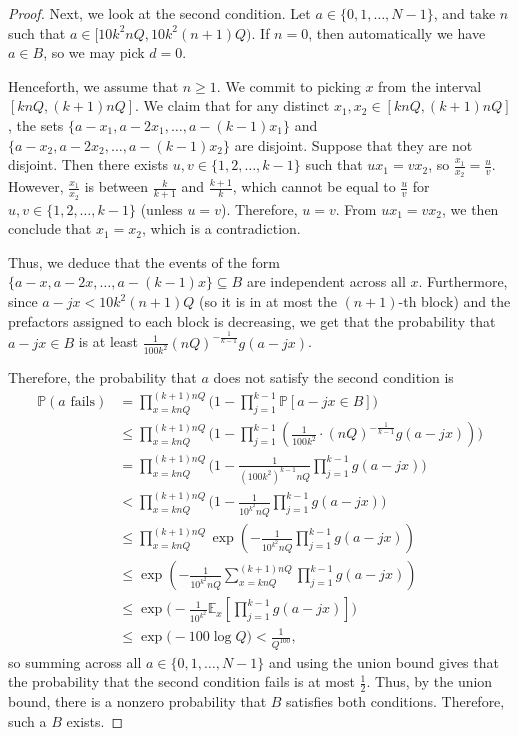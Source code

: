 \documentclass[11pt,reqno]{amsart}
\begin{document}
\begin{proof}
Next, we look at the second condition.
Let $a\in\{0,1,\dots,N-1\}$, and take $n$ such that
$a\in [10k^2nQ, 10k^2(n+1)Q)$.
If $n=0$, then automatically we have $a\in B$,
so we may pick $d=0$.

Henceforth, we assume that $n\geq 1$.
We commit to picking $x$ from the interval $[knQ, (k+1)nQ]$. 
We claim that for any distinct $x_1, x_2\in [knQ, (k+1)nQ]$,
the sets $\{a-x_1, a-2x_1,\dots,a-(k-1)x_1\}$
and $\{a-x_2,a-2x_2,\dots,a-(k-1)x_2\}$ are disjoint.
Suppose that they are not disjoint. Then there exists 
$u,v\in\{1,2,\dots,k-1\}$ such that 
$ux_1 = vx_2$, so $\tfrac{x_1}{x_2} = \tfrac uv$.
However, $\tfrac{x_1}{x_2}$ is between $\tfrac k{k+1}$
and $\tfrac{k+1}k$, which cannot be equal to 
$\tfrac uv$ for $u,v\in\{1,2,\dots,k-1\}$
(unless $u=v$).
Therefore, $u=v$. From $ux_1=vx_2$, we then conclude that 
$x_1=x_2$, which is a contradiction.

Thus, we deduce that the events of the form 
$\{a-x, a-2x,\dots,a-(k-1)x\} \subseteq B$ 
are independent across all $x$.
Furthermore, since $a-jx < 10k^2(n+1)Q$
(so it is in at most the $(n+1)$-th block)
and the prefactors assigned to each block is decreasing,
we get that the probability that $a-jx\in B$ is at least 
$\frac 1{100k^2}(nQ)^{-\frac{1}{k-1}}g(a-jx)$. 

Therefore, the probability that $a$ does not 
satisfy the second condition is
\begin{align*}
\mathbb P(a\text{ fails}) 
&= \prod_{x=knQ}^{(k+1)nQ} \Big(1 - \prod_{j=1}^{k-1} 
\mathbb P[a-jx\in B]\Big) \\
&\leq \prod_{x=knQ}^{(k+1)nQ} \Big(1 - \prod_{j=1}^{k-1} 
\left(\frac 1{100k^2}\cdot 
(nQ)^{-\frac 1{k-1}} g(a-jx)\right)\Big) \\
&= \prod_{x=knQ}^{(k+1)nQ} \Big(1 - 
\frac 1{(100k^2)^{k-1} nQ} \prod_{j=1}^{k-1} g(a-jx)\Big) \\
&< \prod_{x=knQ}^{(k+1)nQ} \Big(1 - 
\frac 1{10^{k^2} nQ} \prod_{j=1}^{k-1} g(a-jx)\Big) \\
&\leq \prod_{x=knQ}^{(k+1)nQ}  \exp\left(-\frac 1{10^{k^2}nQ}
\prod_{j=1}^{k-1} g(a-jx) \right) \tag{using $\exp(-x)\geq 1-x$}\\
&\leq \exp\left(-\frac 1{10^{k^2}nQ} \sum_{x=knQ}^{(k+1)nQ}
\prod_{j=1}^{k-1} g(a-jx) \right)\\
&\leq \exp\Big(-\frac 1{10^{k^2}} 
\mathbb E_x \left[\prod_{j=1}^{k-1} g(a-jx)\right]\Big) \\
&\leq \exp\Big(-100\log Q\Big) < \frac 1{Q^{100}},
\end{align*}
so summing across all $a\in \{0,1,\dots,N-1\}$ 
and using the union bound gives 
that the probability that the second condition fails is at most $\frac 12$.
Thus, by the union bound, there is a nonzero probability
that $B$ satisfies both conditions.
Therefore, such a $B$ exists.
\end{proof}
\end{document}
